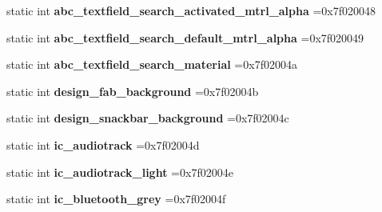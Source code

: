 \begin{DoxyCompactItemize}
static int {\bfseries abc\+\_\+textfield\+\_\+search\+\_\+activated\+\_\+mtrl\+\_\+alpha} =0x7f020048
\item 
\mbox{\label{classandroid_1_1support_1_1v7_1_1recyclerview_1_1R_1_1drawable_a73573e5c748a07b5115fd27fccfe1d7e}} 
static int {\bfseries abc\+\_\+textfield\+\_\+search\+\_\+default\+\_\+mtrl\+\_\+alpha} =0x7f020049
\item 
\mbox{\label{classandroid_1_1support_1_1v7_1_1recyclerview_1_1R_1_1drawable_a49b91c9896d7d3e50ba84cb68bbbd371}} 
static int {\bfseries abc\+\_\+textfield\+\_\+search\+\_\+material} =0x7f02004a
\item 
\mbox{\label{classandroid_1_1support_1_1v7_1_1recyclerview_1_1R_1_1drawable_a3612de602b20637f8a8fb92394aafbde}} 
static int {\bfseries design\+\_\+fab\+\_\+background} =0x7f02004b
\item 
\mbox{\label{classandroid_1_1support_1_1v7_1_1recyclerview_1_1R_1_1drawable_a19971384617998496139e08ea0b32f3a}} 
static int {\bfseries design\+\_\+snackbar\+\_\+background} =0x7f02004c
\item 
\mbox{\label{classandroid_1_1support_1_1v7_1_1recyclerview_1_1R_1_1drawable_a3286925474755503a041c37e5e923075}} 
static int {\bfseries ic\+\_\+audiotrack} =0x7f02004d
\item 
\mbox{\label{classandroid_1_1support_1_1v7_1_1recyclerview_1_1R_1_1drawable_a5da2dfbd15b1418a650b6e7d977de46f}} 
static int {\bfseries ic\+\_\+audiotrack\+\_\+light} =0x7f02004e
\item 
\mbox{\label{classandroid_1_1support_1_1v7_1_1recyclerview_1_1R_1_1drawable_a2ab2b52e107891df2bcf9df033bf0d93}} 
static int {\bfseries ic\+\_\+bluetooth\+\_\+grey} =0x7f02004f
\item 
\mbox{\label{classandroid_1_1support_1_1v7_1_1recyclerview_1_1R_1_1drawable_a4dd6751bcc076aa2adfa1bf7c5ba5f3c}} 

\end{DoxyCompactItemize}
